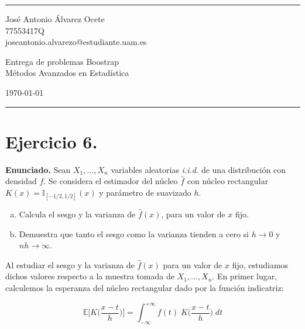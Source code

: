 \documentclass[a4paper]{article}
\newcommand{\E}{\mathbb{E}}
\newcommand{\I}{\mathbb{I}}
\begin{document}
	

\fancyhead[C]{}
\hrule \medskip %
\begin{minipage}{0.295\textwidth} 
	\raggedright
	\footnotesize
	José Antonio Álvarez Ocete \hfill\\   
	77553417Q \hfill\\
	joseantonio.alvarezo@estudiante.uam.es
\end{minipage}
\begin{minipage}{0.4\textwidth} 
	\centering 
	\large 
	Entrega de problemas Boostrap\\ 
	\normalsize 
	Métodos Avanzados en Estadística\\ 
\end{minipage}
\begin{minipage}{0.295\textwidth} 
	\raggedleft
	\today\hfill\\
\end{minipage}
\medskip\hrule 
\bigskip


\section*{Ejercicio 6.}

\textbf{Enunciado.} Sean $X_1, \ldots, X_n$ variables aleatorias \emph{i.i.d.} de una distribución con densidad $f$. Se considera el estimador del núcleo $\hat f$ con núcleo rectangular $K(x) = \I_{[-1/2,1/2]}(x)$ y parámetro de suavizado $h$.

\begin{enumerate}[a)]
	\item Calcula el sesgo y la varianza de $\hat f(x)$, para un valor de $x$ fijo.
	
	\item Demuestra que tanto el sesgo como la varianza tienden a cero si $h \rightarrow 0$ y $nh \rightarrow \infty$.
\end{enumerate}

Al estudiar el sesgo y la varianza de $\hat f(x)$ para un valor de $x$ fijo, estudiamos dichos valores respecto a la muestra tomada de  $X_1, \ldots, X_n$. En primer lugar, calculemos la esperanza del núcleo rectangular dado por la función indicatriz:

\[
	\E \bigg[ K\bigg(\frac{x - t}{h}\bigg) \bigg] = \int_{-\infty}^{+\infty} f(t) \; K\bigg(\frac{x - t}{h}\bigg) \; dt 
\]
\end{document}
